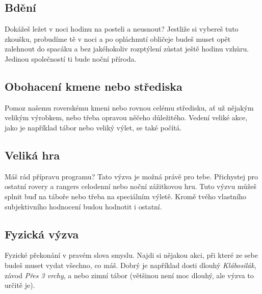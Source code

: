 \documentclass[11pt, fleqn]{article}
\begin{document}
  \subsection*{Bdění}
  Dokážeš ležet v noci hodinu na posteli a neusnout? Jestliže si vybereš tuto zkoušku, probudíme tě v noci a po opláchnutí obličeje budeš muset opět zalehnout do spacáku a bez jakéhokoliv rozptýlení zůstat ještě hodinu vzhůru. Jedinou společností ti bude noční příroda.
  \subsection*{Obohacení kmene nebo střediska}
  Pomoz našemu roverskému kmeni nebo rovnou celému středisku, ať už nějakým velikým výrobkem, nebo třeba opravou něčeho důležitého. Vedení veliké akce, jako je například tábor nebo veliký výlet, se také počítá.
  \subsection*{Veliká hra}
  Máš rád přípravu programu? Tato výzva je možná právě pro tebe. Přichystej pro ostatní rovery a rangers celodenní nebo noční zážitkovou hru. Tuto výzvu můžeš splnit buď na táboře nebo třeba na speciálním výletě. Kromě tvého vlastního subjektivního hodnocení budou hodnotit i ostatní.
  \subsection*{Fyzická výzva}
  Fyzické překonání v pravém slova smyslu. Najdi si nějakou akci, při které ze sebe budeš muset vydat všechno, co máš. Dobrý je například dosti dlouhý \textit{Klábosilák}, závod \textit{Přes 3 vrchy}, a nebo zimní tábor (většinou není moc dlouhý, ale výzva to určitě je).
\end{document}
